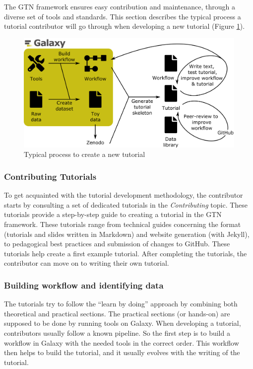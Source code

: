 \documentclass[10pt,letterpaper]{article}
\begin{document}
The GTN framework ensures easy contribution and maintenance, through a diverse set of tools and standards. 
This section describes the typical process a tutorial contributor will go through when developing a new tutorial (Figure \ref{fig:contributing}).

\begin{figure}[!ht]
	\centering
	\includegraphics[width=\textwidth]{images/contributing.png}
	\caption{Typical process to create a new tutorial\label{fig:contributing}}
\end{figure}

\subsubsection*{Contributing Tutorials}

To get acquainted with the tutorial development methodology, the contributor starts by consulting a set of dedicated tutorials in the \emph{Contributing} topic. These tutorials provide a step-by-step guide to creating a tutorial in the GTN framework. These tutorials range from technical guides concerning the format (tutorials and slides written in Markdown) and website generation (with Jekyll), to pedagogical best practices and submission of changes to GitHub. These tutorials help create a first example tutorial. After completing the tutorials, the contributor can move on to writing their own tutorial.

\subsubsection*{Building workflow and identifying data}

The tutorials try to follow the “learn by doing” approach by combining both theoretical and practical sections. The practical sections (or hands-on) are supposed to be done by running tools on Galaxy. When developing a tutorial, contributors usually follow a known pipeline. So the first step is to build a workflow in Galaxy with the needed tools in the correct order. This workflow then helps to build the tutorial, and it usually evolves with the writing of the tutorial.
\end{document}
